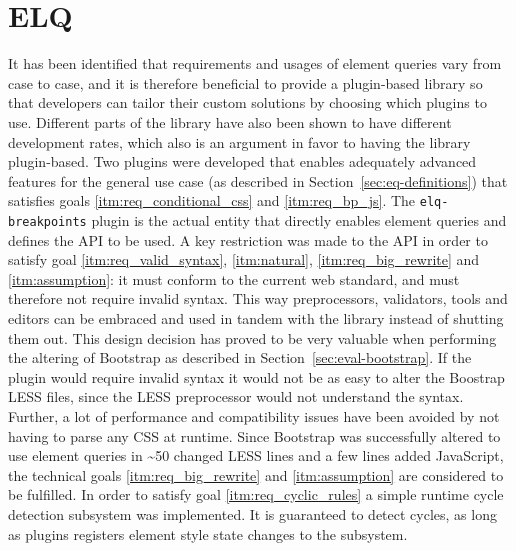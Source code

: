 \documentclass[a4paper,11pt]{kth-mag}
\newcommand{\code}[1]{\texttt{#1}}
\begin{document}
    \section{ELQ}
    It has been identified that requirements and usages of element queries vary from case to case, and it is therefore beneficial to provide a plugin-based library so that developers can tailor their custom solutions by choosing which plugins to use.
    Different parts of the library have also been shown to have different development rates, which also is an argument in favor to having the library plugin-based.
    Two plugins were developed that enables adequately advanced features for the general use case (as described in Section~\ref{sec:eq-definitions}) that satisfies goals \ref{itm:req_conditional_css} and \ref{itm:req_bp_js}.
    The \code{elq-breakpoints} plugin is the actual entity that directly enables element queries and defines the \gls{API} to be used.
    A key restriction was made to the \gls{API} in order to satisfy goal \ref{itm:req_valid_syntax}, \ref{itm:natural}, \ref{itm:req_big_rewrite} and \ref{itm:assumption}: it must conform to the current \gls{web} standard, and must therefore not require invalid syntax.
    This way preprocessors, validators, tools and editors can be embraced and used in tandem with the library instead of shutting them out.
    This design decision has proved to be very valuable when performing the altering of \gls{Bootstrap} as described in Section~\ref{sec:eval-bootstrap}.
    If the plugin would require invalid syntax it would not be as easy to alter the Boostrap \gls{LESS} files, since the \gls{LESS} preprocessor would not understand the syntax.
    Further, a lot of performance and compatibility issues have been avoided by not having to parse any \gls{CSS} at runtime.
    Since \gls{Bootstrap} was successfully altered to use element queries in \textasciitilde50 changed \gls{LESS} lines and a few lines added \gls{JavaScript}, the technical goals \ref{itm:req_big_rewrite} and \ref{itm:assumption} are considered to be fulfilled.
    In order to satisfy goal \ref{itm:req_cyclic_rules} a simple runtime cycle detection subsystem was implemented.
    It is guaranteed to detect cycles, as long as plugins registers element style state changes to the subsystem.
    
\end{document}
